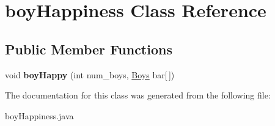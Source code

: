 \hypertarget{classboy_happiness}{}\section{boy\+Happiness Class Reference}
\label{classboy_happiness}
\subsection*{Public Member Functions}
\begin{DoxyCompactItemize}
\item 
\mbox{\label{classboy_happiness_a28f1e1b61d2b51dcf527b771fdf919d1}} 
void {\bfseries boy\+Happy} (int num\+\_\+boys, \hyperlink{class_boys}{Boys} bar\mbox{[}$\,$\mbox{]})
\end{DoxyCompactItemize}


The documentation for this class was generated from the following file\+:\begin{DoxyCompactItemize}
\item 
boy\+Happiness.\+java\end{DoxyCompactItemize}
